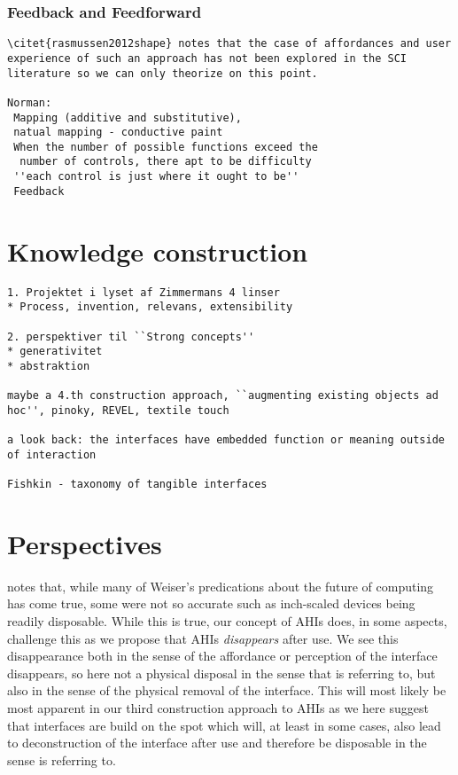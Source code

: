 \subsubsection{Feedback and Feedforward}
\begin{verbatim}
\citet{rasmussen2012shape} notes that the case of affordances and user experience of such an approach has not been explored in the SCI literature so we can only theorize on this point.

Norman: 
 Mapping (additive and substitutive), 
 natual mapping - conductive paint
 When the number of possible functions exceed the 
  number of controls, there apt to be difficulty
 ''each control is just where it ought to be''
 Feedback 

\end{verbatim}
\section{Knowledge construction}

\begin{verbatim}
1. Projektet i lyset af Zimmermans 4 linser
* Process, invention, relevans, extensibility

2. perspektiver til ``Strong concepts''
* generativitet
* abstraktion

maybe a 4.th construction approach, ``augmenting existing objects ad hoc'', pinoky, REVEL, textile touch

a look back: the interfaces have embedded function or meaning outside of interaction

Fishkin - taxonomy of tangible interfaces
\end{verbatim}

\section{Perspectives}

\citet{abowd2012next} notes that, while many of Weiser's predications about the future of computing has come true, some were not so accurate such as inch-scaled devices being readily disposable.
While this is true, our concept of AHIs does, in some aspects, challenge this as we propose that AHIs \emph{disappears} after use.
We see this disappearance both in the sense of the affordance or perception of the interface disappears, so here not a physical disposal in the sense that \citeauthor{abowd2012next} is referring to, but also in the sense of the physical removal of the interface.
This will most likely be most apparent in our third construction approach to AHIs as we here suggest that interfaces are build on the spot which will, at least in some cases, also lead to deconstruction of the interface after use and therefore be disposable in the sense \citeauthor{abowd2012next} is referring to.

